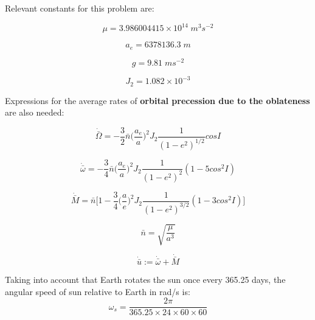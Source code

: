 \documentclass[conf]{new-aiaa}
\begin{document}
Relevant constants for this problem are: 

\begin{equation} 
	\mu  = 3.986004415 \times 10^{14} \; m^3 s^{-2}
	\label{eq:mu}
\end{equation}

\begin{equation}
	a_e = 6378136.3 \; m 
\end{equation}

\begin{equation} 
	g = 9.81 \; m s^{-2}
\end{equation} 

\begin{equation} 
	J_2 = 1.082 \times 10^{-3}
\end{equation} 

Expressions for the average rates of \textbf{orbital precession due to the oblateness} are also needed: 

\begin{equation} 
	\dot{ \bar{ \Omega } } = - \dfrac{3}{2} \bar{n} \big( \dfrac{a_e}{a} \big)^2 J_2 \dfrac{1}{( 1-e^2 )^{1/2}} cos I 
	\label{eq:dbarOmega}
\end{equation} 

\begin{equation}
	\dot{\bar{\omega}} = - \dfrac{3}{4} \bar{n} \big( \dfrac{a_e}{a} \big)^2 J_2 \dfrac{1}{( 1-e^2 )^2} ( 1-5cos^2 I )
	\label{eq:dbarw}
\end{equation}

\begin{equation}
	\dot{\bar{M}} = \bar{n} \Big[ 1 - \dfrac{3}{4} \big( \dfrac{a}{e} \big)^2 J_2 \dfrac{1}{( 1-e^2 )^{3/2}} ( 1-3 cos^2 I ) \Big]
	\label{eq:dbarM}
\end{equation}

\begin{equation}
	\bar{n} = \sqrt{ \dfrac{\mu}{a^3} }
	\label{eq:barn}
\end{equation}

\begin{equation}
	\dot{\bar{u}} :=  \dot{\bar{\omega}} + \dot{\bar{M}}
	\label{eq:dbaru}
\end{equation}

Taking into account that Earth rotates the sun once every 365.25 days, the angular speed of sun relative to Earth in rad/s is: 
\begin{equation}
	\omega_s = \dfrac{ 2 \pi }{ 365.25 \times 24 \times 60 \times 60 }
	\label{eq:omega_s}
\end{equation}
\end{document}
